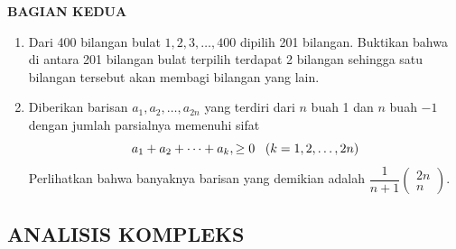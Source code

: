 \documentclass[12pt,twoside]{article}
\begin{document}
\newpage \textbf{BAGIAN KEDUA}
\begin{enumerate}
	\item Dari 400 bilangan bulat $1,2,3,\dots,400$ dipilih 201 bilangan. Buktikan bahwa di antara 201 bilangan bulat terpilih terdapat 2 bilangan sehingga satu bilangan tersebut akan membagi bilangan yang lain.

	\item Diberikan barisan $a_1, a_2,\dots, a_{2n}$ yang terdiri dari $n$ buah 1 dan $n$ buah $-1$ dengan jumlah parsialnya memenuhi sifat
	      \begin{equation*}
		      a_1 + a_2 +\dots+ a_k, \geq 0 \,\,\,\,\, \space (k = 1,2,\dots,2n)
	      \end{equation*}
	      Perlihatkan bahwa banyaknya barisan yang demikian adalah $\dfrac{1}{n+1} \left( \begin{array}{c}
				      2n \\n
			      \end{array} \right) $.
\end{enumerate}

\newpage \subsection{ANALISIS KOMPLEKS}
\end{document}
